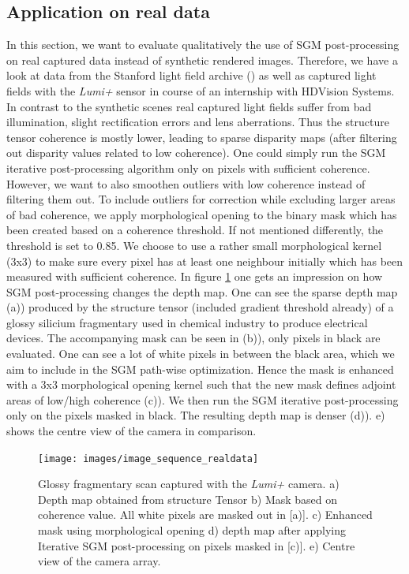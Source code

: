 \documentclass  [
  paper    = a4,
  BCOR     = 10mm,
  twoside,
  fontsize = 12pt,
  fleqn,
  toc      = bibnumbered,
  toc      = listofnumbered,
  numbers  = noendperiod,
  headings = normal,
  listof   = leveldown,
  version  = 3.03
]                                       {scrreprt}
\begin{document}
\subsection{Application on real data}
\label{sec:realdata}
In this section, we want to evaluate qualitatively the use of SGM post-processing on real captured data instead of synthetic rendered images. Therefore, we have a look at data from the Stanford light field archive (\cite{wiburn2004high}) as well as captured light fields with the \textit{Lumi+} sensor in course of an internship with HDVision Systems. In contrast to the synthetic scenes real captured light fields suffer from bad illumination, slight rectification errors and lens aberrations. Thus the structure tensor coherence is mostly lower, leading to sparse disparity maps (after filtering out disparity values related to low coherence). One could simply run the SGM iterative post-processing algorithm only on pixels with sufficient coherence. However, we want to also smoothen outliers with low coherence instead of filtering them out. To include outliers for correction while excluding larger areas of bad coherence, we apply morphological opening to the binary mask which has been created based on a coherence threshold. If not mentioned differently, the threshold is set to 0.85. We choose to use a rather small morphological kernel (3x3) to make sure every pixel has at least one neighbour initially which has been measured with sufficient coherence. In figure \ref{fig:imagesequencerealdata} one gets an impression on how SGM post-processing changes the depth map. One can see the sparse depth map (a)) produced by the structure tensor (included gradient threshold already) of a glossy silicium fragmentary used in chemical industry to produce electrical devices. The accompanying mask can be seen in (b)), only pixels in black are evaluated. One can see a lot of white pixels in between the black area, which we aim to include in the SGM path-wise optimization. Hence the mask is enhanced with a 3x3 morphological opening kernel such that the new mask defines adjoint areas of low/high coherence (c)). We then run the SGM iterative post-processing only on the pixels masked in black. The resulting depth map is denser (d)). e) shows the centre view of the camera in comparison.

\begin{figure}[h!]
	\centering
	\texttt{[image: images/image\_sequence\_realdata]}
	\caption[Silicium scan with iterative SGM]{Glossy fragmentary scan captured with the \textit{Lumi+} camera. a) Depth map obtained from structure Tensor b) Mask based on coherence value. All white pixels are masked out in [a)]. c) Enhanced mask using morphological opening d) depth map after applying Iterative SGM post-processing  on pixels masked in [c)]. e) Centre view of the camera array.}
	\label{fig:imagesequencerealdata}
\end{figure}
\end{document}
